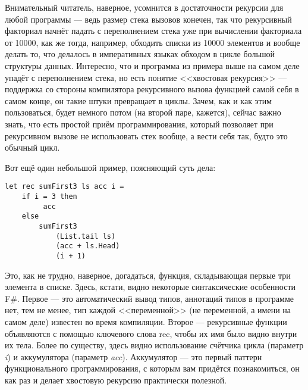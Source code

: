 \documentclass[a5paper]{article}
\begin{document}
Внимательный читатель, наверное, усомнится в достаточности рекурсии для любой программы --- ведь размер стека вызовов конечен, так что рекурсивный факториал начнёт падать с переполнением стека уже при вычислении факториала от 10000, как же тогда, например, обходить списки из 10000 элементов и вообще делать то, что делалось в императивных языках обходом в цикле большой структуры данных. Интересно, что и программа из примера выше на самом деле упадёт с переполнением стека, но есть понятие <<хвостовая рекурсия>> --- поддержка со стороны компилятора рекурсивного вызова функцией самой себя в самом конце, он такие штуки превращает в циклы. Зачем, как и как этим пользоваться, будет немного потом (на второй паре, кажется), сейчас важно знать, что есть простой приём программирования, который позволяет при рекурсивном вызове не использовать стек вообще, а вести себя так, будто это обычный цикл.

Вот ещё один небольшой пример, поясняющий суть дела:
\begin{verbatim}
let rec sumFirst3 ls acc i =
    if i = 3 then 
         acc 
    else 
        sumFirst3 
            (List.tail ls) 
            (acc + ls.Head) 
            (i + 1)
\end{verbatim}

Это, как не трудно, наверное, догадаться, функция, складывающая первые три элемента в списке. Здесь, кстати, видно некоторые синтаксические особенности F\#. Первое --- это автоматический вывод типов, аннотаций типов в программе нет, тем не менее, тип каждой <<переменной>> (не переменной, а имени на самом деле) известен во время компиляции. Второе --- рекурсивные функции объявляются с помощью ключевого слова rec, чтобы их имя было видно внутри их тела. Более по существу, здесь видно использование счётчика цикла (параметр \textit{i}) и аккумулятора (параметр \textit{acc}). Аккумулятор --- это первый паттерн функционального программирования, с которым вам придётся познакомиться, он как раз и делает хвостовую рекурсию практически полезной. 
\end{document}
